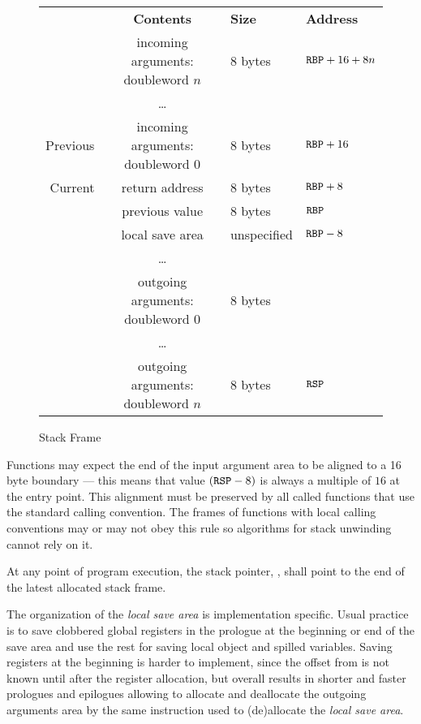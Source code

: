 \begin{figure}
\Hrule
  \caption{Stack Frame}
  \label{fig-stack-frame}
  \begin{center}
    \begin{tabular}{r|cl|l}
      \noalign{\smallskip}
      \multicolumn{1}{l}{\bf Frame} &
      \multicolumn{1}{c}{\bf Contents} &
      \multicolumn{1}{l}{\bf Size} &
      \multicolumn{1}{l}{\bf Address} \\
      \noalign{\smallskip}  \cline{2-3}
      & incoming arguments: doubleword $n$ & 8 bytes & ${\texttt{RBP}}+16+8n$ \\
      & \dots & & \\
      Previous& incoming arguments: doubleword $0$ & 8 bytes & ${\texttt{RBP}}+16$ \\ \cline{1-4} 
      Current & return address & 8 bytes & ${\texttt{RBP}}+8$\\ \cline{2-3}
      & previous \RBP{} value & 8 bytes & ${\texttt{RBP}}$ \\ \cline{2-3}
      & local save area & unspecified & ${\texttt{RBP}}-8$\\ 
      & \dots & & \\ \cline {2-3}
      & outgoing arguments: doubleword $0$ & 8 bytes &\\
      & \dots & & \\
      & outgoing arguments: doubleword $n$ & 8 bytes & ${\texttt{RSP}}$ \\ \cline{2-3}
    \end{tabular}
  \end{center}
\Hrule
\end{figure}


Functions may expect the end of the input argument area to be aligned
to a 16 byte boundary --- this means that value $({\texttt{RSP}} - 8)$ is always a
multiple of $16$ at the entry point. This alignment must be preserved by
all called functions that use the standard calling convention. The
frames of functions with local calling conventions may or may not obey
this rule so algorithms for stack unwinding cannot rely on it.

At any point of program execution, the stack pointer, \RSP, shall
point to the end of the latest allocated stack frame.

The organization of the \emph{local save area} is implementation
specific. Usual practice is to save clobbered global registers in the
prologue at the beginning or end of the save area and use the rest for saving
local object and spilled variables.  Saving registers at the beginning
is harder to implement, since the offset from \RBP{} is not known
until after the register allocation, but overall results in shorter
and faster prologues and epilogues allowing to allocate and deallocate
the outgoing arguments area by the same instruction used to
(de)allocate the \emph{local save area}.

